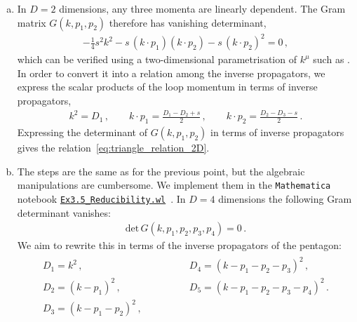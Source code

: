 \begin{enumerate}[a)]
\begin{align}
\end{align}
Inserting this into the numerator of the triangle integral, expanding, and removing the scaleless integrals which integrate to zero finally gives
\begin{align} \begin{aligned}
F^{[2-2\eps]}_{3}(p_1,p_2) & = \frac{1}{s} \int_k \frac{1}{k^2 (k-p_1)^2} + \text{terms missed in $2D$} \\
& = \frac{1}{s} \, F_2^{[2-2\eps]}(p_1)  + \text{terms missed in $2D$}\,.
\end{aligned}
\end{align}
Up to terms which are missed by the two-dimensional analysis, the triangle integral in $D=2-2\eps$ dimensions can be expressed in terms of a bubble integral, and is thus reducible.

\smallskip

\item In $D=2$ dimensions, any three momenta are linearly dependent. The Gram matrix $G(k,p_1,p_2)$ therefore has vanishing determinant,
\begin{align}
-\frac{1}{4} s^2 k^2 - s \, (k\cdot p_1) (k \cdot p_2) - s \, (k \cdot p_2)^2 = 0 \,,
\end{align}
which can be verified using a two-dimensional parametrisation of $k^{\mu}$ such as . In order to convert it into a relation among the inverse propagators, we express the scalar products of the loop momentum in terms of inverse propagators,
\begin{align} 
k^2 = D_1 \,, \qquad k\cdot p_1 = \frac{D_1-D_2+s}{2} \,, \qquad k\cdot p_2 = \frac{D_2-D_3-s}{2} \,.
\end{align}
Expressing the determinant of $G(k,p_1,p_2)$ in terms of inverse propagators gives the relation~\eqref{eq:triangle_relation_2D}.

\smallskip

\item The steps are the same as for the previous point, but the algebraic manipulations are cumbersome. We implement them in the \texttt{Mathematica} notebook \href{https://scattering-amplitudes.mpp.mpg.de/scattering-amplitudes-in-qft/Exercises/}{\texttt{Ex3.5\_Reducibility.wl}}~\cite{ch5-website}.
In $D=4$ dimensions the following Gram determinant vanishes:
\begin{align} \label{eq:pentagon_Gramdet}
\text{det} \, G\left(k,p_1,p_2,p_3,p_4\right) = 0\,.
\end{align}
We aim to rewrite this in terms of the inverse propagators of the pentagon:
\begin{align} \label{eq:pentagon_Ds}
\begin{array}{ll}
D_1 = k^2 \,, &  D_4 = (k-p_1-p_2-p_3)^2 \,,  \\
D_2 = (k-p_1)^2 \,, \qquad \quad & D_5 = (k-p_1-p_2-p_3-p_4)^2 \,. \\
D_3 = (k-p_1-p_2)^2 \,, \qquad \qquad & \\
\end{array}
\end{align}


\end{enumerate}
